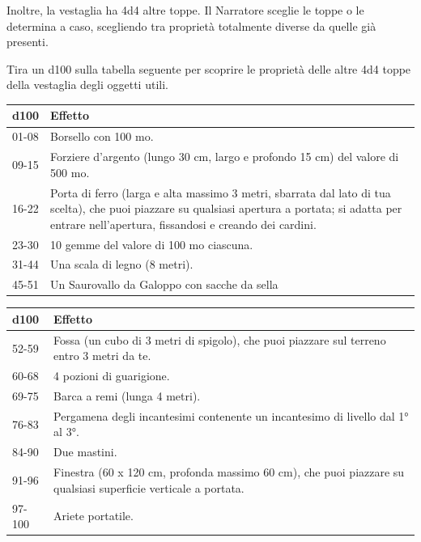 \begin{multicols}{2}
Inoltre, la vestaglia ha 4d4 altre toppe. Il Narratore sceglie le toppe o le determina a caso, scegliendo tra proprietà totalmente diverse da quelle già presenti.

Tira un d100 sulla tabella seguente per scoprire le proprietà delle altre 4d4 toppe della vestaglia degli oggetti utili.


\medskip

\noindent\begin{tabularx}{\linewidth}{lX}
	\toprule
\rowcolor{gray!20}\textbf{d100} & \textbf{Effetto}\\
\toprule
01-08 &Borsello con 100 mo.\\
\rowcolor{gray!20}09-15& Forziere d'argento (lungo 30 cm, largo e profondo 15 cm) del valore di 500 mo.\\
16-22& Porta di ferro (larga e alta massimo 3 metri, sbarrata dal lato di tua scelta), che puoi piazzare su qualsiasi apertura a portata; si adatta per entrare nell'apertura, fissandosi e creando dei cardini.\\
\rowcolor{gray!20}23-30 &10 gemme del valore di 100 mo ciascuna.\\
31-44 &Una scala di legno (8 metri).\\
\rowcolor{gray!20}45-51 &Un Saurovallo da Galoppo con sacche da sella \\
\end{tabularx}
\noindent\begin{tabularx}{\linewidth}{lX}
\toprule
\rowcolor{gray!20}\textbf{d100} & \textbf{Effetto}\\
\toprule
52-59 & Fossa (un cubo di 3 metri di spigolo), che puoi piazzare sul terreno entro 3 metri da te.\\
\rowcolor{gray!20}60-68 &4 pozioni di guarigione. \\
69-75 &Barca a remi (lunga 4 metri).\\
\rowcolor{gray!20}76-83& Pergamena degli incantesimi contenente un incantesimo di livello dal 1° al 3°.\\
84-90& Due mastini.\\
\rowcolor{gray!20}91-96 &Finestra (60 x 120 cm, profonda massimo 60 cm), che puoi piazzare su qualsiasi superficie verticale a portata.\\
97-100 &Ariete portatile.
\end{tabularx}



\end{multicols}
